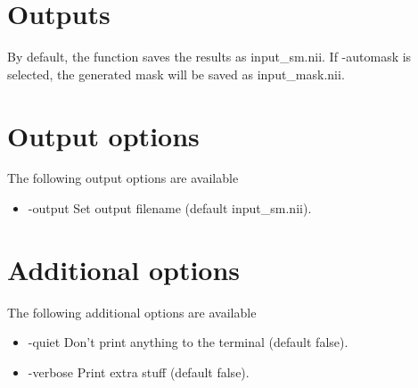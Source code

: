 \section{Outputs}

By default, the function saves the results as input\_sm.nii. If -automask is selected, the generated mask will be saved as input\_mask.nii.

\section{Output options}

The following output options are available

\begin{itemize}

\item -output 
\newline \newline Set output filename (default input\_sm.nii). 

\end{itemize}

\section{Additional options}

The following additional options are available

\begin{itemize}

\item -quiet 
\newline \newline Don't print anything to the terminal (default false). 

\item -verbose
\newline \newline Print extra stuff (default false).
 

\end{itemize}


